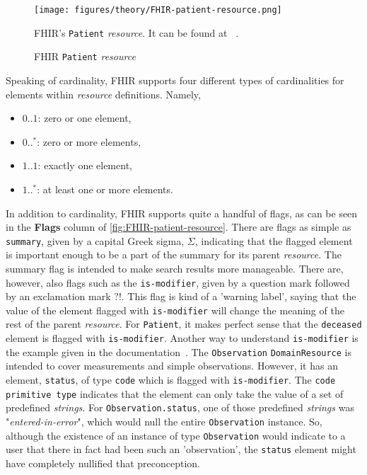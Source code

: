 \begin{figure}[H]
    \centering
    \texttt{[image: figures/theory/FHIR-patient-resource.png]}
    \caption{FHIR \texttt{Patient} \emph{resource}}
    \medskip
    \small
    \raggedright
    FHIR's \texttt{Patient} \emph{resource}. It can be found at ~\cite{FHIR-patient-resource}.
    \label{fig:FHIR-patient-resource}
\end{figure}

\noindent
Speaking of cardinality, FHIR supports four different types of cardinalities for elements within \emph{resource} definitions. Namely,
\begin{itemize}
    \item $0..1$: zero or one element,
    \item $0..^\ast$: zero or more elements,
    \item $1..1$: exactly one element,
    \item $1..^\ast$: at least one or more elements.
\end{itemize}

\noindent
In addition to cardinality, FHIR supports quite a handful of flags, as can be seen in the \textbf{Flags} column of \autoref{fig:FHIR-patient-resource}. There are flags as simple as \texttt{summary}, given by a capital Greek sigma, $\Sigma$, indicating that the flagged element is important enough to be a part of the summary for its parent \emph{resource}. The summary flag is intended to make search results more manageable. There are, however, also flags such as the \texttt{is-modifier}, given by a question mark followed by an exclamation mark $?!$. This flag is kind of a 'warning label', saying that the value of the element flagged with \texttt{is-modifier} will change the meaning of the rest of the parent \emph{resource}. For \texttt{Patient}, it makes perfect sense that the \texttt{deceased} element is flagged with \texttt{is-modifier}. Another way to understand \texttt{is-modifier} is the example given in the documentation~\cite{FHIR-isModifier-flag}. The \texttt{Observation} \texttt{DomainResource} is intended to cover measurements and simple observations. However, it has an element, \texttt{status}, of type \texttt{code} which is flagged with \texttt{is-modifier}. The \texttt{code} \texttt{primitive type} indicates that the element can only take the value of a set of predefined \emph{strings}. For \texttt{Observation.status}, one of those predefined \emph{strings} was "\emph{entered-in-error}", which would null the entire \texttt{Observation} instance. So, although the existence of an instance of type \texttt{Observation} would indicate to a user that there in fact had been such an 'observation', the \texttt{status} element might have completely nullified that preconception. 
